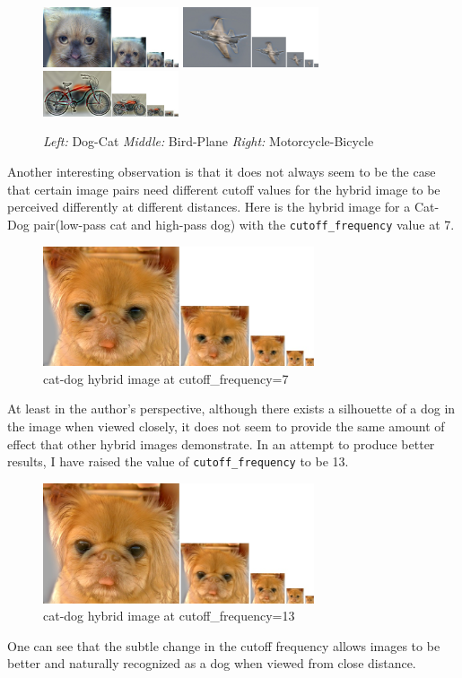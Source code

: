 \begin{figure}[h]
    \centering
    \includegraphics[width=4cm]{dog-cat.jpg}
    \includegraphics[width=4cm]{bird-plane.jpg}
    \includegraphics[width=4cm]{motorcycle-bicycle.jpg}
    \caption{\emph{Left:} Dog-Cat \emph{Middle:} Bird-Plane \emph{Right:} Motorcycle-Bicycle}
\end{figure}

Another interesting observation is that it does not always seem to be the case that certain image pairs need different cutoff values for the hybrid image to be perceived differently at different distances. Here is the hybrid image for a Cat-Dog pair(low-pass cat and high-pass dog) with the \texttt{cutoff\_frequency} value at 7.

\begin{figure}[h]
    \centering
    \includegraphics[width=8cm]{cat-dog.jpg}
    \caption{cat-dog hybrid image at cutoff\_frequency=7}
\end{figure}

At least in the author's perspective, although there exists a silhouette of a dog in the image when viewed closely, it does not seem to provide the same amount of effect that other hybrid images demonstrate. In an attempt to produce better results, I have raised the value of \texttt{cutoff\_frequency} to be 13.

\begin{figure}[h]
    \centering
    \includegraphics[width=8cm]{cat-dog-improved.jpg}
    \caption{cat-dog hybrid image at cutoff\_frequency=13}
\end{figure}

One can see that the subtle change in the cutoff frequency allows images to be better and naturally recognized as a dog when viewed from close distance.



